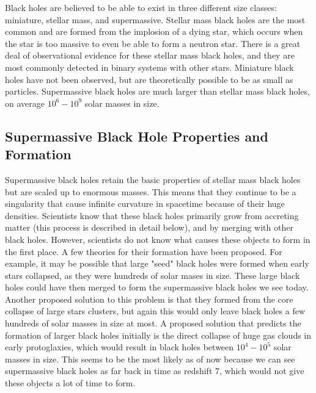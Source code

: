 \documentclass[12pt]{article}
\begin{document}
Black holes are believed to be able to exist in three different size classes:
miniature, stellar mass, and supermassive.  Stellar mass black holes are the
most common and are formed from the implosion of a dying star, which occurs when
the star is too massive to even be able to form a neutron star.  There is a
great deal of observational evidence for these stellar mass black holes, and
they are most commonly detected in binary systems with other stars.  Miniature
black holes have not been observed, but are theoretically possible to be as
small as particles.  Supermassive black holes are much larger than stellar mass
black holes, on average $10^6 -10^9$ solar masses in size.

\subsection{Supermassive Black Hole Properties and Formation}
Supermassive black holes retain the basic properties of stellar mass black holes
but are scaled up to enormous masses.  This means that they continue to be a
singularity that cause infinite curvature in spacetime because of their huge
densities.  Scientists know that these black holes primarily grow from accreting
matter (this process is described in detail below), and by merging with other
black holes.  However, scientists do not know what causes these objects to form
in the first place.  A few theories for their formation have been proposed.  For
example, it may be possible that large "seed" black holes were formed when early
stars collapsed, as they were hundreds of solar mases in size.  These large
black holes could have then merged to form the supermassive black holes we see
today.  Another proposed solution to this problem is that they formed from the
core collapse of large stars clusters, but again this would only leave black
holes a few hundreds of solar masses in size at most.  A proposed solution that
predicts the formation of larger black holes initially is the direct collapse of
huge gas clouds in early protoglaxies, which would result in black holes between
$10^4 - 10^5$ solar masses in size.  This seems to be the most likely as of now
because we can see supermassive black holes as far back in time as redshift 7,
which would not give these objects a lot of time to form.
\end{document}
